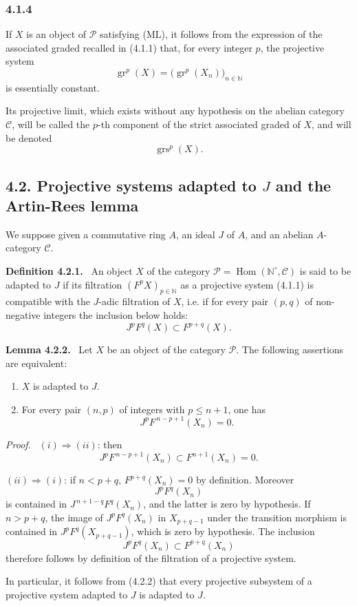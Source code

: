 \documentclass[11pt]{article}
\newenvironment{statement}[1]{\par\medskip\noindent\textbf{#1.}\ }{\par\medskip}
\newenvironment{prooftext}[1][Proof]{\par\noindent\emph{#1.}\ }{\par\medskip}
\DeclareMathOperator{\Hom}{Hom}
\providecommand{\gr}{\operatorname{gr}}
\providecommand{\Hom}{\operatorname{Hom}}
\providecommand{\gr}{\operatorname{gr}}
\providecommand{\gr}{\operatorname{gr}}
\providecommand{\grs}{\operatorname{grs}}
\begin{document}
\subsubsection*{4.1.4}
If \(X\) is an object of \(\mathcal P\) satisfying (ML), it follows from the expression of the associated graded recalled in (4.1.1) that, for every integer \(p\), the projective system
\[
\gr^p(X)=\bigl(\gr^p(X_n)\bigr)_{n\in\mathbb N}
\]
is essentially constant.

Its projective limit, which exists without any hypothesis on the abelian category \(\mathcal C\), will be called the \(p\)-th component of the strict associated graded of \(X\), and will be denoted
\[
\grs^p(X).
\]

\subsection*{4.2. Projective systems adapted to \(J\) and the Artin-Rees lemma}

We suppose given a commutative ring \(A\), an ideal \(J\) of \(A\), and an abelian \(A\)-category \(\mathcal C\).

\begin{statement}{Definition 4.2.1}
An object \(X\) of the category \(\mathcal P=\Hom(\mathbb N^\circ,\mathcal C)\) is said to be adapted to \(J\) if its filtration \((F^pX)_{p\in\mathbb N}\) as a projective system (4.1.1) is compatible with the \(J\)-adic filtration of \(X\), i.e. if for every pair \((p,q)\) of non-negative integers the inclusion below holds:
\[
J^pF^q(X)\subset F^{p+q}(X).
\]
\end{statement}

\begin{statement}{Lemma 4.2.2}
Let \(X\) be an object of the category \(\mathcal P\). The following assertions are equivalent:
\begin{enumerate}[label=\textup{(\roman*)}]
\item \(X\) is adapted to \(J\).
\item For every pair \((n,p)\) of integers with \(p\le n+1\), one has
\[
J^pF^{\,n-p+1}(X_n)=0 .
\]
\end{enumerate}
\end{statement}

\begin{prooftext}
\((i)\Rightarrow(ii)\): then
\[
J^pF^{\,n-p+1}(X_n)\subset F^{n+1}(X_n)=0.
\]

\((ii)\Rightarrow(i)\): if \(n<p+q\), \(F^{p+q}(X_n)=0\) by definition. Moreover
\[
J^pF^q(X_n)
\]
is contained in \(J^{\,n+1-q}F^q(X_n)\), and the latter is zero by hypothesis. If \(n>p+q\), the image of \(J^pF^q(X_n)\) in \(X_{p+q-1}\) under the transition morphism is contained in \(J^pF^q(X_{p+q-1})\), which is zero by hypothesis. The inclusion
\[
J^pF^q(X_n)\subset F^{p+q}(X_n)
\]
therefore follows by definition of the filtration of a projective system.

In particular, it follows from (4.2.2) that every projective subsystem of a projective system adapted to \(J\) is adapted to \(J\).
\end{prooftext}
\end{document}
